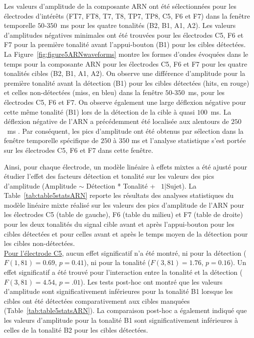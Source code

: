 Les valeurs d'amplitude de la composante ARN ont été sélectionnées pour les électrodes d'intérêts (FT7, FT8, T7, T8, TP7, TP8, C5, F6 et F7) dans la fenêtre temporelle $50$-$350$~ms pour les quatre tonalités (B2, B1, A1, A2). 
Les valeurs d'amplitudes négatives minimales ont été trouvées pour les électrodes C5, F6 et F7 pour la première tonalité avant l'appui-bouton (B1) pour les cibles détectées. 
La Figure~\ref{fig:figure5ARNwaveforms} montre les formes d'ondes évoquées dans le temps pour la composante ARN pour les électrodes C5, F6 et F7 pour les quatre tonalités cibles (B2, B1, A1, A2). 
On observe une différence d'amplitude pour la première tonalité avant la détection (B1) pour les cibles détectées (hits, en rouge) et celles non-détectées (miss, en bleu) dans la fenêtre $50$-$350$~ms, pour les électrodes C5, F6 et F7. 
On observe également une large déflexion négative pour cette même tonalité (B1) lors de la détection de la cible à quasi $100$~ms. 
La déflexion négative de l'ARN a précédemment été localisée aux alentours de $250$~ms \citep{gutschalk2008neural}. 
Par conséquent, les pics d'amplitude ont été obtenus par sélection dans la fenêtre temporelle spécifique de $250$ à $350$ ms et l'analyse statistique s'est portée sur les électrodes C5, F6 et F7 dans cette fenêtre. 

Ainsi, pour chaque électrode, un modèle linéaire à effets mixtes a été ajusté pour étudier l'effet des facteurs détection et tonalité sur les valeurs des pics d'amplitude (Amplitude $\sim$ Détection * Tonalité + ~$1|$Sujet). 
La Table~\ref{tab:table5statsARN} reporte les résultats des analyses statistiques du modèle linéaire mixte réalisé sur les valeurs des pics d'amplitude de l'ARN pour les électrodes C5 (table de gauche), F6 (table du milieu) et F7 (table de droite) pour les deux tonalités du signal cible avant et après l'appui-bouton pour les cibles détectées et pour celles avant et après le temps moyen de la détection pour les cibles non-détectées. \\

\underline{Pour l'électrode C5}, aucun effet significatif n'a été montré, ni pour la détection ($F(1,81)=0.69$, $p=0.41$), ni pour la tonalité ($F(3,81)=1.76$, $p=0.16$).
Un effet significatif a été trouvé pour l'interaction entre la tonalité et la détection ($F(3,81)=4.54$, $p=.01$). 
Les tests post-hoc ont montré que les valeurs d'amplitude sont significativement inférieures pour la tonalité B1 lorsque les cibles ont été détectées comparativement aux cibles manquées (Table~\ref{tab:table5statsARN}). 
La comparaison post-hoc a également indiqué que les valeurs d'amplitude pour la tonalité B1 sont significativement inférieures à celles de la tonalité B2 pour les cibles détectées. 

